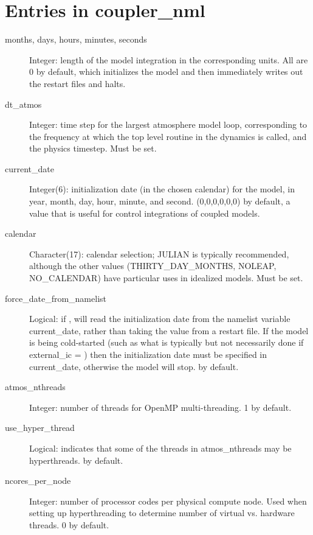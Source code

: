 \documentclass[12pt,letterpaper]{book}
\begin{document}
\section{Entries in coupler\_nml}

\begin{description}


\item[months, days, hours, minutes, seconds] Integer: length of the model integration in the corresponding units. All are 0 by default, which initializes the model and then immediately writes out the restart files and halts.

\item[dt\_atmos] Integer: time step for the largest atmosphere model loop, corresponding to the frequency at which the top level routine in the dynamics is called, and the physics timestep. Must be set.

\item[current\_date] Integer(6): initialization date (in the chosen calendar) for the model, in year, month, day, hour, minute, and second. (0,0,0,0,0,0) by default, a value that is useful for control integrations of coupled models.

\item[calendar] Character(17): calendar selection; JULIAN is typically recommended, although the other values (THIRTY\_DAY\_MONTHS, NOLEAP, NO\_CALENDAR) have particular uses in idealized models. Must be set.

\item[force\_date\_from\_namelist] Logical: if \true , will read the initialization date from the namelist variable current\_date, rather than taking the value from a restart file. If the model is being cold-started (such as what is typically but not necessarily done if external\_ic = \true ) then the initialization date must be specified in current\_date, otherwise the model will stop. \false  by default.


\item[atmos\_nthreads] Integer: number of threads for OpenMP multi-threading. 1 by default.

\item[use\_hyper\_thread] Logical: indicates that some of the threads in atmos\_nthreads may be hyperthreads. \false  by default.

\item[ncores\_per\_node] Integer: number of processor codes per physical compute node. Used when setting up hyperthreading to determine number of virtual vs. hardware threads. 0 by default.


\end{description}
\end{document}
